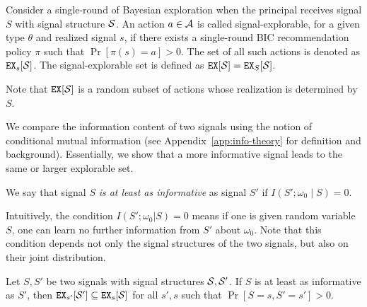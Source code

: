\begin{definition}
Consider a single-round of Bayesian exploration when the principal receives signal $S$ with signal structure $\S$. An action $a \in \A$ is called signal-explorable, for a given type $\theta$ and realized signal $s$, if there exists a single-round BIC recommendation policy $\pi$ such that $\Pr[\pi(s) = a] > 0$. The set of all such actions is denoted as $\EX_s[\S]$. The signal-explorable set is defined as $\EX[\S] = \EX_S[\S]$.
\end{definition}

Note that $\EX[\S]$ is a random subset of actions whose realization is determined by $S$.

We compare the information content of two signals using the notion of conditional mutual information (see Appendix~\ref{app:info-theory} for definition and background). Essentially, we show that a more informative signal leads to the same or larger explorable set.

\begin{definition}
We say that signal $S$ \emph{is at least as informative} as signal $S'$ if $I(S' ; \omega_0\mid S) = 0$.
\end{definition}

Intuitively, the condition $I(S';\omega_0|S)= 0$  means if one is given random variable $S$, one can learn no further information from $S'$ about $\omega_0$. Note that this condition depends not only the signal structures of the two signals, but also on their joint distribution.

\begin{lemma}
\label{lem:infomono}
Let $S,S'$ be two signals with signal structures $\S,\S'$. If $S$ is at least as informative as $S'$, then $\EX_{s'}[\S'] \subseteq \EX_s[\S]$ for all $s' ,s$ such that $\Pr[S= s, S'= s'] > 0$.
\end{lemma}

